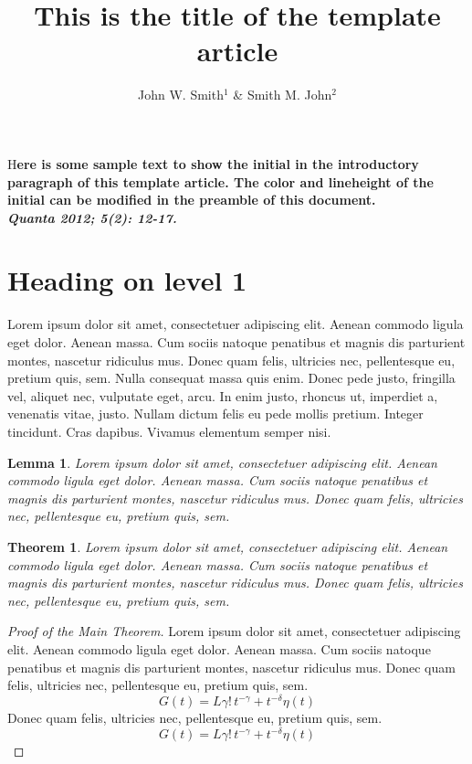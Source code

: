 \documentclass[12pt]{article}
\title{This is the title of the template article}                                       %
\author{John W. Smith$^{1}$ \& Smith M. John$^{2}$\\[12pt]}                                                                                 %
\date{}                                                                                                                                                         %
\newtheorem{lemma}{Lemma}
\newtheorem{theorem}{Theorem}
\newcommand{\initial}[1]{%
     \lettrine[lines=3,lhang=0.3,nindent=0em]{
                                \color[HTML]{31ADF3}
                                {\textsf{#1}}}{}}
\begin{document}
\maketitle
\thispagestyle{fancy}                   %
\initial{H}\textbf{ere is some sample text to show the initial in the introductory paragraph of this template article. The color and lineheight of the initial can be modified in the preamble of this document.\\ \textbf{\emph{Quanta 2012; 5(2): 12-17.}}}

\section*{Heading on level 1}
Lorem ipsum dolor sit amet, consectetuer adipiscing elit. Aenean commodo ligula eget dolor. Aenean massa. Cum sociis natoque penatibus et magnis dis parturient montes, nascetur ridiculus mus. Donec quam felis, ultricies nec, pellentesque eu, pretium quis, sem. Nulla consequat massa quis enim. Donec pede justo, fringilla vel, aliquet nec, vulputate eget, arcu. In enim justo, rhoncus ut, imperdiet a, venenatis vitae, justo. Nullam dictum felis eu pede mollis pretium. Integer tincidunt. Cras dapibus. Vivamus elementum semper nisi. 

\begin{lemma} Lorem ipsum dolor sit amet, consectetuer adipiscing elit. Aenean commodo ligula eget dolor. Aenean massa. Cum sociis natoque penatibus et magnis dis parturient montes, nascetur ridiculus mus. Donec quam felis, ultricies nec, pellentesque eu, pretium quis, sem.  
\end{lemma}

\begin{theorem} Lorem ipsum dolor sit amet, consectetuer adipiscing elit. Aenean commodo ligula eget dolor. Aenean massa. Cum sociis natoque penatibus et magnis dis parturient montes, nascetur ridiculus mus. Donec quam felis, ultricies nec, pellentesque eu, pretium quis, sem. 
\end{theorem}

\begin{proof}[Proof of the Main Theorem] Lorem ipsum dolor sit amet, consectetuer adipiscing elit. Aenean commodo ligula eget dolor. Aenean massa. Cum sociis natoque penatibus et magnis dis parturient montes, nascetur ridiculus mus. Donec quam felis, ultricies nec, pellentesque eu, pretium quis, sem. 
\begin{equation}G(t)=L\gamma!\,t^{-\gamma}+t^{-\delta}\eta(t) \end{equation}
Donec quam felis, ultricies nec, pellentesque eu, pretium quis, sem.
\begin{equation}G(t)=L\gamma!\,t^{-\gamma}+t^{-\delta}\eta(t) \end{equation}
\end{proof}
\end{document}
